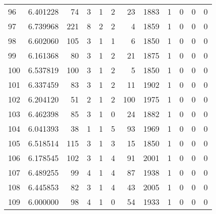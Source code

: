 \begin{tabular}{lrrrrrrrrrrr}
96  &  6.401228 &   74 &      3 &        1 &      2 &              23 &  1883 &               1 &               0 &               0 &               0 \\
97  &  6.739968 &  221 &      8 &        2 &      2 &               4 &  1859 &               1 &               0 &               0 &               0 \\
98  &  6.602060 &  105 &      3 &        1 &      1 &               6 &  1850 &               1 &               0 &               0 &               0 \\
99  &  6.161368 &   80 &      3 &        1 &      2 &              21 &  1875 &               1 &               0 &               0 &               0 \\
100 &  6.537819 &  100 &      3 &        1 &      2 &               5 &  1850 &               1 &               0 &               0 &               0 \\
101 &  6.337459 &   83 &      3 &        1 &      2 &              11 &  1902 &               1 &               0 &               0 &               0 \\
102 &  6.204120 &   51 &      2 &        1 &      2 &             100 &  1975 &               1 &               0 &               0 &               0 \\
103 &  6.462398 &   85 &      3 &        1 &      0 &              24 &  1882 &               1 &               0 &               0 &               0 \\
104 &  6.041393 &   38 &      1 &        1 &      5 &              93 &  1969 &               1 &               0 &               0 &               0 \\
105 &  6.518514 &  115 &      3 &        1 &      3 &              15 &  1850 &               1 &               0 &               0 &               0 \\
106 &  6.178545 &  102 &      3 &        1 &      4 &              91 &  2001 &               1 &               0 &               0 &               0 \\
107 &  6.489255 &   99 &      4 &        1 &      4 &              87 &  1938 &               1 &               0 &               0 &               0 \\
108 &  6.445853 &   82 &      3 &        1 &      4 &              43 &  2005 &               1 &               0 &               0 &               0 \\
109 &  6.000000 &   98 &      4 &        1 &      0 &              54 &  1933 &               1 &               0 &               0 &               0 \\

\end{tabular}
